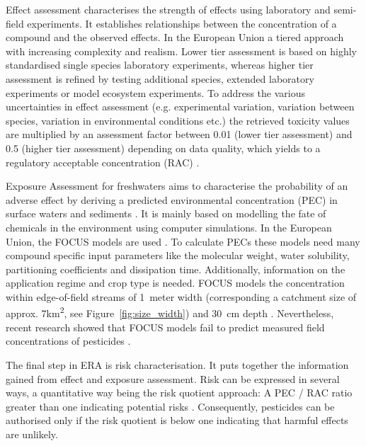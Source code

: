 Effect assessment characterises the strength of effects using laboratory and semi-field experiments.
It establishes relationships between the concentration of a compound and the observed effects.
In the European Union a tiered approach with increasing complexity and realism.
Lower tier assessment is based on highly standardised single species laboratory experiments, whereas higher tier assessment is refined by testing additional species, extended laboratory experiments or model ecosystem experiments. 
To address the various uncertainties in effect assessment (e.g. experimental variation, variation between species, variation in environmental conditions etc.) the retrieved toxicity values are multiplied by an assessment factor between 0.01 (lower tier assessment) and 0.5 (higher tier assessment) depending on data quality, which yields to a regulatory acceptable concentration (RAC) \citep{efsa_guidance_2013}. 

Exposure Assessment for freshwaters aims to characterise the probability of an adverse effect by deriving a predicted environmental concentration (PEC) in surface waters and sediments \citep{newman_fundamentals_2015}. 
It is mainly based on modelling the fate of chemicals in the environment using computer simulations. 
In the European Union, the FOCUS models are used \citep{focus_focus_2001, efsa_guidance_2013}.
To calculate PECs these models need many compound specific input parameters like the molecular weight, water solubility, partitioning coefficients and dissipation time. 
Additionally, information on the application regime and crop type is needed. 
FOCUS models the concentration within edge-of-field streams of 1~meter width (corresponding a catchment size of approx. 7km\textsuperscript{2}, see Figure~\ref{fig:size_width}) and 30~cm depth \citep{erlacher_regulation_2011}. 
Nevertheless, recent research showed that FOCUS models fail to predict measured field concentrations of pesticides \citep{knabel_regulatory_2012, knabel_fungicide_2014}. 

The final step in ERA is risk characterisation.
It puts together the information gained from effect and exposure assessment. 
Risk can be expressed in several ways, a quantitative way being the risk quotient approach: A PEC / RAC ratio greater than one indicating potential risks \citep{efsa_guidance_2013, suter_ecological_2007, amiard-triquet_aquatic_2015}. 
Consequently, pesticides can be authorised only if the risk quotient is below one indicating that harmful effects are unlikely.



